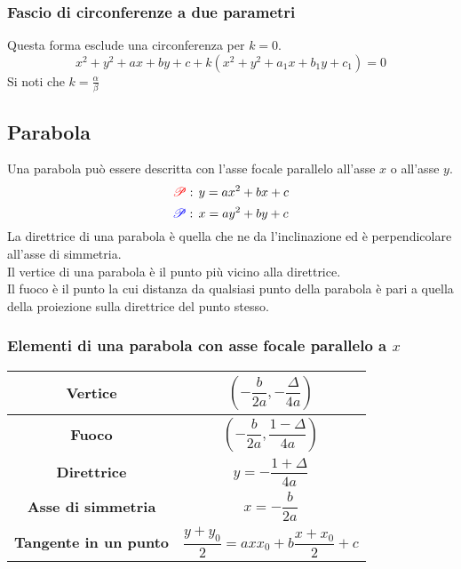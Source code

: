 \subsubsection{Fascio di circonferenze a due parametri}
Questa forma esclude una circonferenza per $k=0$.
\begin{equation*}
  x^2+y^2+ax+by+c+k(x^2+y^2+a_1x+b_1y+c_1) = 0
\end{equation*}
Si noti che $k=\frac{\alpha}{\beta}$

\subsection{Parabola}\label{subsec:geomanal:parabola}
\begin{center}
\end{center}
Una parabola può essere descritta con l'asse focale parallelo all'asse $x$ o all'asse $y$.
\begin{equation*}
  \mathcolor{red}{\mathscr{P}}:\,y=ax^2+bx+c
\end{equation*}
\begin{equation*}
  \mathcolor{blue}{\mathscr{P}}:\,x=ay^2+by+c
\end{equation*}
La direttrice di una parabola è quella che ne da l'inclinazione ed è perpendicolare all'asse di
simmetria.\\
Il vertice di una parabola è il punto più vicino alla direttrice.\\
Il fuoco è il punto la cui distanza da qualsiasi punto della parabola è pari a quella della proiezione
sulla direttrice del punto stesso.

\subsubsection{Elementi di una parabola con asse focale parallelo a $x$}
\begin{center}
  \begin{tabular}{c | c}
    \textbf{Vertice} & $\left(-\dfrac{b}{2a}, -\dfrac{\Delta}{4a}\right)$\\\hline
    \textbf{Fuoco} & $\left(-\dfrac{b}{2a},\dfrac{1-\Delta}{4a}\right)$\\\hline
    \textbf{Direttrice} & $y=-\dfrac{1+\Delta}{4a}$\\\hline
    \textbf{Asse di simmetria} & $x=-\dfrac{b}{2a}$\\\hline
    \textbf{Tangente in un punto} & $\dfrac{y+y_0}{2}=axx_0+b\dfrac{x+x_0}{2}+c$
  \end{tabular}
\end{center}

